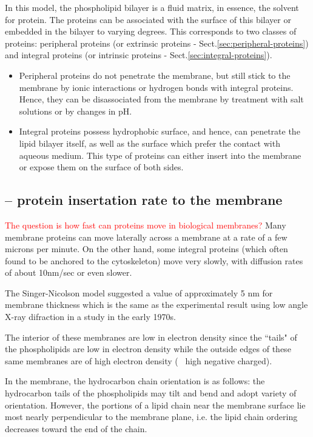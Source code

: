 In this model, the phospholipid bilayer is a fluid matrix, in essence, the
solvent for protein. The proteins can be associated with the surface of this
bilayer or embedded in the bilayer to varying degrees. This corresponds to two
classes of proteins: peripheral proteins (or extrinsic proteins -
Sect.\ref{sec:peripheral-proteins}) and integral proteins (or intrinsic
proteins - Sect.\ref{sec:integral-proteins}).

\begin{itemize}
\item Peripheral proteins do not penetrate the membrane, but still
  stick to the membrane by ionic interactions or hydrogen bonds with
  integral proteins. Hence, they can be disassociated from the
  membrane by treatment with salt solutions or by changes in pH.

\item Integral proteins possess hydrophobic surface, and hence, can
  penetrate the lipid bilayer itself, as well as the surface which
  prefer the contact with aqueous medium. This type of proteins can
  either insert into the membrane or expose them on the surface of
  both sides.

\end{itemize}

\subsection{-- protein insertation rate to the membrane}

\textcolor{red}{The question is how fast can proteins move in
  biological membranes?} Many membrane proteins can move laterally
  across a membrane at a rate of a few microns per minute. On the
  other hand, some integral proteins (which often found to be anchored
  to the cytoskeleton) move very slowly, with diffusion rates of about
  10nm/sec or even slower.

The Singer-Nicolson model suggested a value of approximately 5 nm for
membrane thickness which is the same as the experimental result using
low angle X-ray difraction in a study in the early 1970s. 

The interior of these membranes are low in electron density since the
``tails" of the phospholipids are low in electron density while the
outside edges of these same membranes are of high electron density (~
high negative charged).

In the membrane, the hydrocarbon chain orientation is as follows: the
hydrocarbon tails of the phospholipids may tilt and bend and adopt
variety of orientation. However, the portions of a lipid chain near
the membrane surface lie most nearly perpendicular to the membrane
plane, i.e. the lipid chain ordering decreases toward the end of the
chain.

